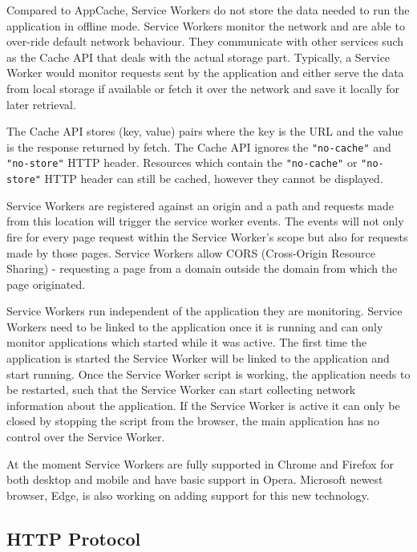 \documentclass[10pt,a4paper,twoside]{book}
\begin{document}
Compared to AppCache, Service Workers do not store the data needed to run the application in offline mode. Service Workers monitor the network and are able to over-ride default network behaviour. They communicate with other services such as the Cache API that deals with the actual storage part. Typically, a Service Worker would monitor requests sent by the application and either serve the data from local storage if available or fetch it over the network and save it locally for later retrieval. 

The Cache API stores (key, value) pairs where the key is the URL and the value is the response returned by fetch. The Cache API ignores the \texttt{"no-cache"} and \texttt{"no-store"} HTTP header. Resources which contain the \texttt{"no-cache"} or \texttt{"no-store"} HTTP header can still be cached, however they cannot be displayed. 

Service Workers are registered against an origin and a path and requests made from this location will trigger the service worker events. The events will not only fire for every page request within the Service Worker's scope but also for requests made by those pages. Service Workers allow CORS (Cross-Origin Resource Sharing) - requesting a page from a domain outside the domain from which the page originated.

Service Workers run independent of the application they are monitoring. Service Workers need to be linked to the application once it is running and can only monitor applications which started while it was active. The first time the application is started the Service Worker will be linked to the application and start running. Once the Service Worker script is working, the application needs to be restarted, such that the Service Worker can start collecting network information about the application. If the Service Worker is active it can only be closed by stopping the script from the browser, the main application has no control over the Service Worker.

At the moment Service Workers are fully supported in Chrome and Firefox for both desktop and mobile and have basic support in Opera. Microsoft newest browser, Edge, is also working on adding support for this new technology.

\subsection{HTTP Protocol}
\end{document}
